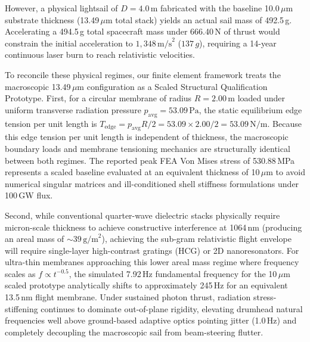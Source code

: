\documentclass[aps,prd,reprint,superscriptaddress,nofootinbib,floatfix]{revtex4-2}
\begin{document}
However, a physical lightsail of $D=4.0$\,m fabricated with the baseline 10.0\,$\mu\mathrm{m}$ substrate thickness (13.49\,$\mu\mathrm{m}$ total stack) yields an actual sail mass of 492.5\,g. Accelerating a 494.5\,g total spacecraft mass under 666.40\,N of thrust would constrain the initial acceleration to $1,348\,\mathrm{m/s}^2$ ($137\,g$), requiring a 14-year continuous laser burn to reach relativistic velocities.

To reconcile these physical regimes, our finite element framework treats the macroscopic 13.49\,$\mu\mathrm{m}$ configuration as a Scaled Structural Qualification Prototype. First, for a circular membrane of radius $R = 2.00\,\mathrm{m}$ loaded under uniform transverse radiation pressure $p_{\mathrm{avg}} = 53.09\,\mathrm{Pa}$, the static equilibrium edge tension per unit length is $T_{\mathrm{edge}} = p_{\mathrm{avg}} R / 2 = 53.09 \times 2.00 / 2 = 53.09\,\mathrm{N/m}$. Because this edge tension per unit length is independent of thickness, the macroscopic boundary loads and membrane tensioning mechanics are structurally identical between both regimes. The reported peak FEA Von Mises stress of 530.88\,MPa represents a scaled baseline evaluated at an equivalent thickness of 10\,$\mu\mathrm{m}$ to avoid numerical singular matrices and ill-conditioned shell stiffness formulations under 100\,GW flux.

Second, while conventional quarter-wave dielectric stacks physically require micron-scale thickness to achieve constructive interference at 1064\,nm (producing an areal mass of $\sim 39\,\mathrm{g/m}^2$), achieving the sub-gram relativistic flight envelope will require single-layer high-contrast gratings (HCG) or 2D nanoresonators. For ultra-thin membranes approaching this lower areal mass regime where frequency scales as $f \propto t^{-0.5}$, the simulated 7.92\,Hz fundamental frequency for the 10\,$\mu\mathrm{m}$ scaled prototype analytically shifts to approximately 245\,Hz for an equivalent 13.5\,nm flight membrane. Under sustained photon thrust, radiation stress-stiffening continues to dominate out-of-plane rigidity, elevating drumhead natural frequencies well above ground-based adaptive optics pointing jitter (1.0\,Hz) and completely decoupling the macroscopic sail from beam-steering flutter.
\end{document}
